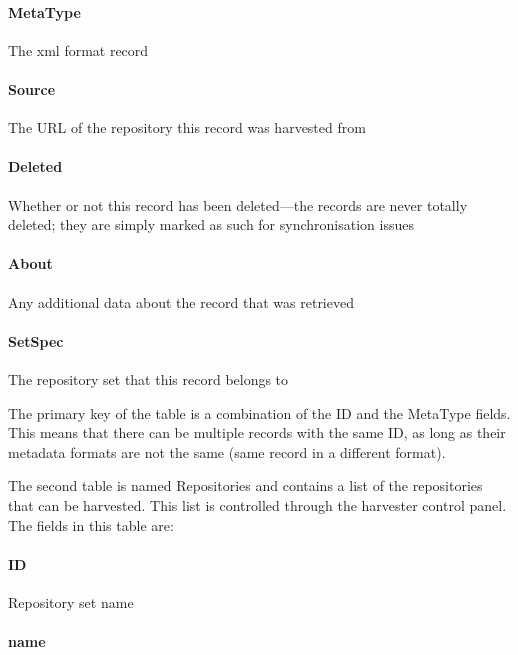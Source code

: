 \documentclass[a4paper,11pt]{article}
\begin{document}
\paragraph{MetaType} 

The xml format record

\paragraph{Source} 

The URL of the repository this record was harvested from

\paragraph{Deleted} 

Whether or not this record has been deleted---the records are never totally deleted; they are simply marked as such for synchronisation issues

\paragraph{About} 

Any additional data about the record that was retrieved

\paragraph{SetSpec} 

The repository set that this record belongs to

The primary key of the table is a combination of the ID and the MetaType fields. This means that there can be multiple records with the same ID, as long as their metadata formats are not the same (same record in a different format).

The second table is named Repositories and contains a list of the repositories that can be harvested. This list is controlled through the harvester control panel. The fields in this table are: 

\paragraph{ID} Repository set name

\paragraph{name} 
\end{document}

